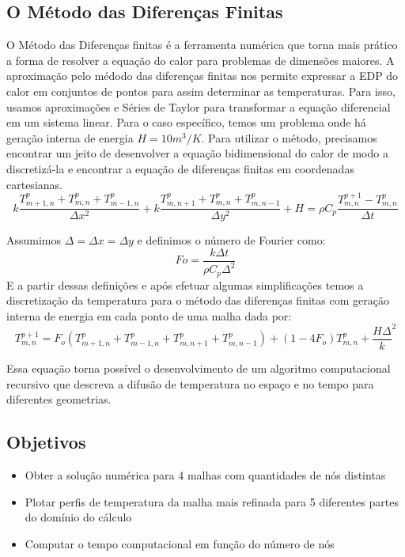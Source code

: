 \documentclass[article]{abntex2}
\begin{document}
\subsection{O Método das Diferenças Finitas}
O Método das Diferenças finitas é a ferramenta numérica que torna mais prático a forma de resolver a equação do calor para problemas de dimensões maiores. A aproximação pelo médodo das diferenças finitas nos permite expressar a EDP do calor em conjuntos de pontos para assim determinar as temperaturas. Para isso, usamos aproximações e Séries de Taylor para transformar a equação diferencial em um sistema linear. Para o caso específico, temos um problema onde há geração interna de energia $H=10m^3/K$. 
Para utilizar o método, precisamos encontrar um jeito de desenvolver a equação bidimensional do calor de modo a discretizá-la e encontrar a equação de diferenças finitas em coordenadas cartesianas. 
$$k\frac{T_{m+1,n}^{p}+T_{m,n}^{p}+T_{m-1,n}^{p}}{\Delta x^2}+k\frac{T_{m,n+1}^{p}+T_{m,n}^{p}+T_{m,n-1}^{p}}{\Delta y^2}+H = \rho C_{p} \frac{T_{m,n}^{p+1}-T_{m,n}^{p}}{\Delta t}$$

Assumimos $\Delta = \Delta x = \Delta y $ e definimos o número de Fourier como: $$Fo=\frac{k\Delta t}{\rho C_{p} \Delta^2}$$
E a partir dessas definições e após efetuar algumas simplificações temos a discretização da temperatura para o método das diferenças finitas com geração interna de energia em cada ponto de uma malha dada por:
$$T_{m,n}^{p+1} = F_{o}(T_{m+1,n}^{p} + T_{m-1,n}^{p} + T_{m,n+1}^{p} + T_{m,n-1}^{p}) + (1-4F_{o})T_{m,n}^{p} + \frac{H\Delta }{k}^2 $$

Essa equação torna possível o desenvolvimento de um algoritmo computacional recursivo que descreva a difusão de temperatura no espaço e no tempo para diferentes geometrias.

\subsection{Objetivos}

\begin{itemize}
    \item Obter a solução numérica para 4 malhas com quantidades de nós distintas
    \item Plotar perfis de temperatura da malha mais refinada para 5 diferentes partes do domínio do cálculo
    \item Computar o tempo computacional em função do número de nós
\end{itemize}
\end{document}
